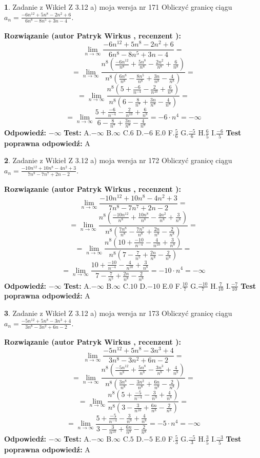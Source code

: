 \documentclass[12pt, a4paper]{article}
\theoremstyle{definition} %
\newtheorem{zad}{}
\newcommand{\zadStart}[1]{\begin{zad}#1\newline}
\newcommand{\zadStop}{\end{zad}}
\newcommand{\rozwStart}[2]{\noindent \textbf{Rozwiązanie (autor #1 , recenzent #2): }\newline}
\newcommand{\rozwStop}{\newline}
\newcommand{\odpStart}{\noindent \textbf{Odpowiedź:}\newline}
\newcommand{\odpStop}{\newline}
\newcommand{\testStart}{\noindent \textbf{Test:}\newline}
\newcommand{\testStop}{\newline}
\newcommand{\kluczStart}{\noindent \textbf{Test poprawna odpowiedź:}\newline}
\newcommand{\kluczStop}{\newline}
\begin{document}
\zadStart{Zadanie z Wikieł Z 3.12 a) moja wersja nr 171}
Obliczyć granicę ciągu $a_{n}=\frac{-6n^{12}+5n^{8}-2n^{2}+6}{6n^{8}-8n^{5}+3n-4}$.
\zadStop
\rozwStart{Patryk Wirkus}{}
$$\lim\limits_{n\to\infty}\frac{-6n^{12}+5n^{8}-2n^{2}+6}{6n^{8}-8n^{5}+3n-4}=$$
$$=\lim\limits_{n\to\infty}\frac{n^{8}\left(\frac{-6n^{12}}{n^{8}}+\frac{5n^{8}}{n^{8}}-\frac{2n^{2}}{n^{8}}+\frac{6}{n^{8}}\right)}{n^{8}\left(\frac{6n^{8}}{n^{8}}-\frac{8n^{5}}{n^{8}}+\frac{3n}{n^{8}}-\frac{4}{n^{8}}\right)}=$$
$$=\lim\limits_{n\to\infty}\frac{n^{8}\left(5+\frac{-6}{n^{-4}}-\frac{2}{n^{10}}+\frac{6}{n^{8}}\right)}
{n^{8}\left(6-\frac{8}{n^{7}}+\frac{3n}{n^{8}}-\frac{4}{n^{8}}\right)}=$$
$$=\lim\limits_{n\to\infty}\frac{5+\frac{-6}{n^{-4}}-\frac{2}{n^{10}}+\frac{6}{n^{8}}}{6-\frac{8}{n^{7}}+\frac{3n}{n^{8}}-\frac{4}{n^{8}}}=-6\cdot n^{4} = -\infty$$
\rozwStop
\odpStart
$-\infty$
\odpStop
\testStart
A.$-\infty$
B.$\infty$
C.$6$
D.$-6$
E.$0$
F.$\frac{5}{6}$
G.$\frac{-5}{6}$
H.$\frac{6}{5}$
I.$\frac{-6}{5}$
\testStop
\kluczStart
A
\kluczStop



\zadStart{Zadanie z Wikieł Z 3.12 a) moja wersja nr 172}
Obliczyć granicę ciągu $a_{n}=\frac{-10n^{12}+10n^{8}-4n^{2}+3}{7n^{8}-7n^{7}+2n-2}$.
\zadStop
\rozwStart{Patryk Wirkus}{}
$$\lim\limits_{n\to\infty}\frac{-10n^{12}+10n^{8}-4n^{2}+3}{7n^{8}-7n^{7}+2n-2}=$$
$$=\lim\limits_{n\to\infty}\frac{n^{8}\left(\frac{-10n^{12}}{n^{8}}+\frac{10n^{8}}{n^{8}}-\frac{4n^{2}}{n^{8}}+\frac{3}{n^{8}}\right)}{n^{8}\left(\frac{7n^{8}}{n^{8}}-\frac{7n^{7}}{n^{8}}+\frac{2n}{n^{8}}-\frac{2}{n^{8}}\right)}=$$
$$=\lim\limits_{n\to\infty}\frac{n^{8}\left(10+\frac{-10}{n^{-4}}-\frac{4}{n^{10}}+\frac{3}{n^{8}}\right)}
{n^{8}\left(7-\frac{7}{n^{5}}+\frac{2n}{n^{8}}-\frac{2}{n^{8}}\right)}=$$
$$=\lim\limits_{n\to\infty}\frac{10+\frac{-10}{n^{-4}}-\frac{4}{n^{10}}+\frac{3}{n^{8}}}{7-\frac{7}{n^{5}}+\frac{2n}{n^{8}}-\frac{2}{n^{8}}}=-10\cdot n^{4} = -\infty$$
\rozwStop
\odpStart
$-\infty$
\odpStop
\testStart
A.$-\infty$
B.$\infty$
C.$10$
D.$-10$
E.$0$
F.$\frac{10}{7}$
G.$\frac{-10}{7}$
H.$\frac{7}{10}$
I.$\frac{-7}{10}$
\testStop
\kluczStart
A
\kluczStop



\zadStart{Zadanie z Wikieł Z 3.12 a) moja wersja nr 173}
Obliczyć granicę ciągu $a_{n}=\frac{-5n^{12}+5n^{8}-3n^{3}+4}{3n^{8}-3n^{2}+6n-2}$.
\zadStop
\rozwStart{Patryk Wirkus}{}
$$\lim\limits_{n\to\infty}\frac{-5n^{12}+5n^{8}-3n^{3}+4}{3n^{8}-3n^{2}+6n-2}=$$
$$=\lim\limits_{n\to\infty}\frac{n^{8}\left(\frac{-5n^{12}}{n^{8}}+\frac{5n^{8}}{n^{8}}-\frac{3n^{3}}{n^{8}}+\frac{4}{n^{8}}\right)}{n^{8}\left(\frac{3n^{8}}{n^{8}}-\frac{3n^{2}}{n^{8}}+\frac{6n}{n^{8}}-\frac{2}{n^{8}}\right)}=$$
$$=\lim\limits_{n\to\infty}\frac{n^{8}\left(5+\frac{-5}{n^{-4}}-\frac{3}{n^{9}}+\frac{4}{n^{8}}\right)}
{n^{8}\left(3-\frac{3}{n^{10}}+\frac{6n}{n^{8}}-\frac{2}{n^{8}}\right)}=$$
$$=\lim\limits_{n\to\infty}\frac{5+\frac{-5}{n^{-4}}-\frac{3}{n^{9}}+\frac{4}{n^{8}}}{3-\frac{3}{n^{10}}+\frac{6n}{n^{8}}-\frac{2}{n^{8}}}=-5\cdot n^{4} = -\infty$$
\rozwStop
\odpStart
$-\infty$
\odpStop
\testStart
A.$-\infty$
B.$\infty$
C.$5$
D.$-5$
E.$0$
F.$\frac{5}{3}$
G.$\frac{-5}{3}$
H.$\frac{3}{5}$
I.$\frac{-3}{5}$
\testStop
\kluczStart
A
\kluczStop
\end{document}
